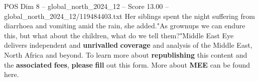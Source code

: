 \begin{textsample}{POS Dim 8 – global\_north\_2024\_12 – Score 13.00 – global\_north\_2024\_12/119484403.txt}
Her siblings spent the night suffering from diarrhoea and vomiting amid the rain, she added."As grownups we can endure this, but what about the children, what do we tell them?"Middle East Eye delivers independent and \textbf{unrivalled} \textbf{coverage} and analysis of the Middle East, North Africa and beyond.
To learn more about \textbf{republishing} this content and the \textbf{associated} \textbf{fees}, \textbf{please} \textbf{fill} out this form.
More about \textbf{MEE} can be found here.

\end{textsample}
